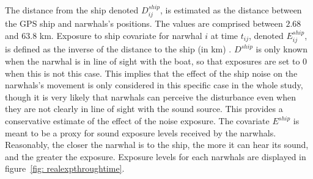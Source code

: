 \documentclass[11pt]{article}
\newcommand {\1}{\mathbb{1}}
\theoremstyle{definition}
\theoremstyle{remark}
\theoremstyle{remark}
\begin{document}

The distance from the ship denoted $D^{ship}_{ij}$, is estimated as the distance between the GPS ship and narwhals's positions. The values are comprised between $2.68$ and $63.8$ km.
Exposure to ship covariate for narwhal $i$ at time $t_{ij}$, denoted $E^{ship}_{ij}$, is defined as the inverse of the distance to the ship (in km) \cite{heide-jorgensen_behavioral_2021}.
$D^{ship}$ is only known when the narwhal is in line of sight with the boat, so that exposures are set to $0$ when this is not this case. This implies that the effect of the ship noise on the narwhals's movement is only considered in this specific case in the whole study, though it is very likely that narwhals can perceive the disturbance even when they are not clearly in line of sight with the sound source. This provides a conservative estimate of the effect of the noise exposure. The covariate $E^{ship}$ is meant to be a proxy for sound exposure levels received by the narwhals. Reasonably, the closer the narwhal is to the ship, the more it can hear its sound, and the greater the exposure. Exposure levels for each narwhals are displayed in figure~\ref{fig: realexpthroughtime}.
\end{document}
